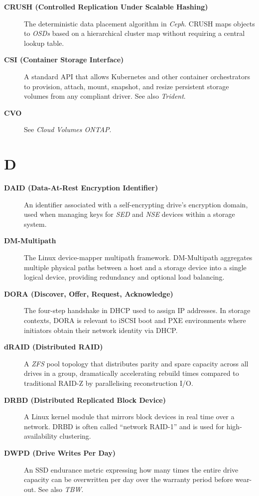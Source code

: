 \begin{description}
\item[\textbf{CRUSH (Controlled Replication Under Scalable Hashing)}]
The deterministic data placement algorithm in \textit{Ceph}. CRUSH maps
objects to \textit{OSDs} based on a hierarchical cluster map without
requiring a central lookup table.

\item[\textbf{CSI (Container Storage Interface)}]
A standard API that allows Kubernetes and other container orchestrators to
provision, attach, mount, snapshot, and resize persistent storage volumes
from any compliant driver. See also \textit{Trident}.

\item[\textbf{CVO}]
See \textit{Cloud Volumes ONTAP}.

\end{description}

\section*{D}

\begin{description}

\item[\textbf{DAID (Data-At-Rest Encryption Identifier)}]
An identifier associated with a self-encrypting drive's encryption domain,
used when managing keys for \textit{SED} and \textit{NSE} devices within a
storage system.

\item[\textbf{DM-Multipath}]
The Linux device-mapper multipath framework. DM-Multipath aggregates
multiple physical paths between a host and a storage device into a single
logical device, providing redundancy and optional load balancing.

\item[\textbf{DORA (Discover, Offer, Request, Acknowledge)}]
The four-step handshake in DHCP used to assign IP addresses. In storage
contexts, DORA is relevant to iSCSI boot and PXE environments where
initiators obtain their network identity via DHCP.

\item[\textbf{dRAID (Distributed RAID)}]
A \textit{ZFS} pool topology that distributes parity and spare capacity
across all drives in a group, dramatically accelerating rebuild times
compared to traditional RAID-Z by parallelising reconstruction I/O.

\item[\textbf{DRBD (Distributed Replicated Block Device)}]
A Linux kernel module that mirrors block devices in real time over a
network. DRBD is often called ``network RAID-1'' and is used for
high-availability clustering.

\item[\textbf{DWPD (Drive Writes Per Day)}]
An SSD endurance metric expressing how many times the entire drive capacity
can be overwritten per day over the warranty period before wear-out. See
also \textit{TBW}.

\end{description}

